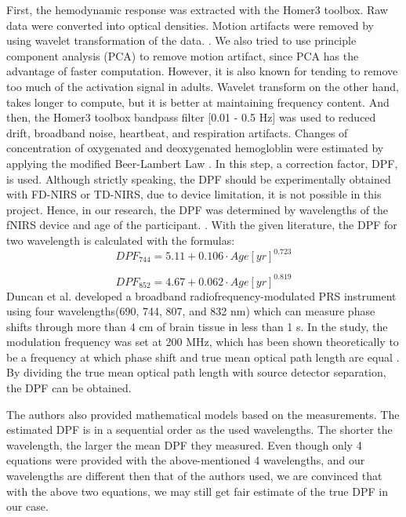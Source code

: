First, the hemodynamic response was extracted with the Homer3 toolbox. Raw data were converted into optical densities. Motion artifacts were removed by using wavelet transformation of the data. \cite {Molavi_2012}. We also tried to use principle component analysis (PCA) to remove motion artifact, since PCA has the advantage of faster computation. However, it is also known for tending to remove too much of the activation signal in adults. Wavelet transform on the other hand, takes longer to compute, but it is better at maintaining frequency content. And then, the Homer3 toolbox bandpass filter [0.01 - 0.5 Hz] was used to reduced drift, broadband noise, heartbeat, and respiration artifacts. Changes of concentration of oxygenated and deoxygenated hemogloblin were estimated by applying the modified Beer-Lambert Law  \cite {Delpy_1988}. In this step, a correction factor, DPF, is used. Although strictly speaking, the DPF should be experimentally obtained with FD-NIRS or TD-NIRS, due to device limitation, it is not possible in this project. Hence, in our research, the DPF was determined by wavelengths of the fNIRS device and age of the participant. \cite {Duncan1996MeasurementOC}. With the given literature, the DPF for two wavelength is calculated with the formulas:
\[
DPF_{744} = 5.11 + 0.106 \cdot Age[yr]^{0.723}
\]

\[
DPF_{852} = 4.67 + 0.062 \cdot Age[yr]^{0.819}
\]
Duncan et al. developed a broadband radiofrequency-modulated PRS instrument using four wavelengths(690, 744, 807, and 832 nm) which can measure phase shifts through more than 4 cm of brain tissue in less than 1 s. In the study, the modulation frequency was set at 200 MHz, which has been shown theoretically to be a frequency at which phase shift and true mean optical path length are equal \cite {Arridge_1992}. By dividing the true mean optical path length with source detector  separation, the DPF can be obtained. 

The authors also provided mathematical models based on the measurements. The estimated DPF is in a sequential order as the used wavelengths. The shorter the wavelength, the larger the mean DPF they measured. Even though only 4 equations were provided with the above-mentioned 4 wavelengths, and our wavelengths are different then that of the authors used, we are convinced that with the above two equations, we may still get fair estimate of the true DPF in our case.

